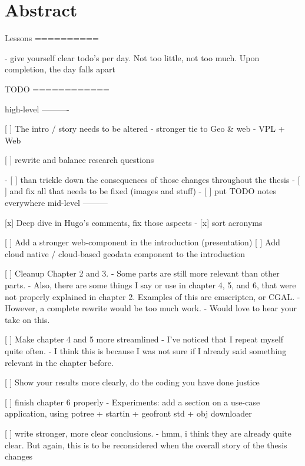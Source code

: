 \chapter*{Abstract}


\begin{note}

    Lessons
    ==========
    
    - give yourself clear todo's per day. 
      Not too little, not too much.
      Upon completion, the day falls apart
    
    
    TODO
    ============
    
    high-level
    ----------
    
    [ ] The intro / story needs to be altered 
        - stronger tie to Geo & web
        - VPL + Web
    
    [ ] rewrite and balance research questions
    
    - [ ] than trickle down the consequences of those changes throughout the thesis
    - [ ] and fix all that needs to be fixed (images and stuff)
    - [ ] put TODO notes everywhere
    mid-level
    ---------
    
    [x] Deep dive in Hugo's comments, fix those aspects 
      - [x] sort acronyms
    
    [ ] Add a stronger web-component in the introduction (presentation)
    [ ] Add cloud native / cloud-based geodata component to the introduction  
    
    [ ] Cleanup Chapter 2 and 3.  
      - Some parts are still more relevant than other parts. 
      - Also, there are some things I say or use in chapter 4, 5, and 6, that were not properly explained in chapter 2. Examples of this are emscripten, or CGAL. 
      - However, a complete rewrite would be too much work.
      - Would love to hear your take on this.
    
    [ ] Make chapter 4 and 5 more streamlined 
      - I've noticed that I repeat myself quite often.
      - I think this is because I was not sure if I already said something relevant in the chapter before.
    
    [ ] Show your results more clearly, do the coding you have done justice
    
    [ ] finish chapter 6 properly 
      - Experiments: add a section on a use-case application, using potree + startin + geofront std + obj downloader
    
    [ ] write stronger, more clear conclusions.
      - hmm, i think they are already quite clear. But again, this is to be reconsidered when the overall story of the thesis changes  
    

\end{note}
